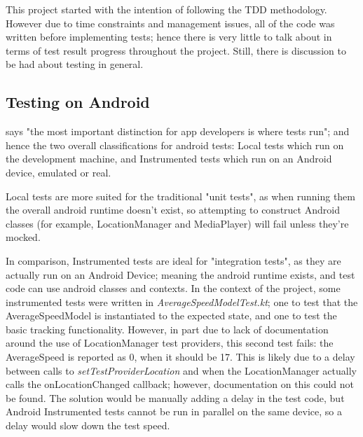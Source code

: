 \documentclass[11pt, a4paper, notitlepage]{report}
\begin{document}
This project started with the intention of following the TDD methodology. However due to time constraints and management issues, all of the code was written before implementing tests; hence there is very little to talk about in terms of test result progress throughout the project. Still, there is discussion to be had about testing in general.

\subsection{Testing on Android}
\citet{testingAndroid} says "the most important distinction for app developers is where tests run"; and hence the two overall classifications for android tests: Local tests which run on the development machine, and Instrumented tests which run on an Android device, emulated or real.

Local tests are more suited for the traditional "unit tests", as when running them the overall android runtime doesn't exist, so attempting to construct Android classes (for example, LocationManager and MediaPlayer) will fail unless they're mocked.

In comparison, Instrumented tests are ideal for "integration tests", as they are actually run on an Android Device; meaning the android runtime exists, and test code can use android classes and contexts. In the context of the project, some instrumented tests were written in \textit{AverageSpeedModelTest.kt}; one to test that the AverageSpeedModel is instantiated to the expected state, and one to test the basic tracking functionality. However, in part due to lack of documentation around the use of LocationManager test providers, this second test fails: the AverageSpeed is reported as 0, when it should be 17. This is likely due to a delay between calls to \textit{setTestProviderLocation} and when the LocationManager actually calls the onLocationChanged callback; however, documentation on this could not be found. The solution would be manually adding a delay in the test code, but Android Instrumented tests cannot be run in parallel on the same device, so a delay would slow down the test speed.
\end{document}
